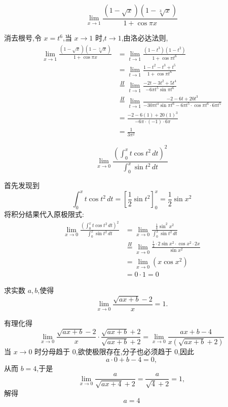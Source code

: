\begin{questions}
    \question 
    \[
    \lim_{x \to 1} \frac{(1 - \sqrt{x})(1 - \sqrt[3]{x})}{1 + \cos \pi x}
    \]
    \begin{solution}
        消去根号,令 $x = t^6$,当 $x \to 1$ 时,$t \to 1$,由洛必达法则,
        \begin{align*}
        \lim_{x \to 1} \frac{(1 - \sqrt{x})(1 - \sqrt[3]{x})}{1 + \cos \pi x} 
        &= \lim_{t \to 1} \frac{(1 - t^3)(1 - t^2)}{1 + \cos \pi t^6} \\
        &= \lim_{t \to 1} \frac{1 - t^2 - t^3 + t^5}{1 + \cos \pi t^6} \\
        &\overset{H}{=} \lim_{t \to 1} \frac{-2t - 3t^2 + 5t^4}{-6\pi t^5 \sin \pi t^6} \\
        &\overset{H}{=} \lim_{t \to 1} \frac{-2 - 6t + 20t^3}{-30\pi t^4 \sin \pi t^6 - 6\pi t^5 \cdot \cos \pi t^6 \cdot 6\pi t^5} \\
        &= \frac{-2 - 6(1) + 20(1)^3}{-6\pi \cdot (-1) \cdot 6\pi} \\
        &= \frac{1}{3\pi^2}
        \end{align*}
    \end{solution}

    \question 
    \[
    \lim_{x \to 0} \frac{\left(\int_0^x t \cos t^2 \, dt \right)^2}{\int_0^x \sin t^2 \, dt}
    \]
    \begin{solution}
        首先发现到
        \[
        \int_0^x t \cos t^2 \, dt = \left[ \frac{1}{2} \sin t^2 \right]_0^x = \frac{1}{2} \sin x^2
        \]
        将积分结果代入原极限式:
        \begin{align*}
        \lim_{x \to 0} \frac{\left(\int_0^x t \cos t^2 \, dt \right)^2}{\int_0^x \sin t^2 \, dt} 
        &= \lim_{x \to 0} \frac{\frac{1}{4} \sin^2 x^2}{\int_0^x \sin t^2 \, dt} \\
        &\overset{H}{=} \lim_{x \to 0} \frac{\frac{1}{4} \cdot 2 \sin x^2 \cdot \cos x^2 \cdot 2x}{\sin x^2} \\
        &= \lim_{x \to 0} (x \cos x^2) \\
        &= 0 \cdot 1 = 0
        \end{align*}
    \end{solution}

    \question 求实数 $a,b$,使得
    \[
    \lim_{x\to 0}\frac{\sqrt{ax+b}-2}{x}=1.
    \]
    \begin{solution}
        有理化得
        \[
        \lim_{x\to 0}\frac{\sqrt{ax+b}-2}{x}\cdot
        \frac{\sqrt{ax+b}+2}{\sqrt{ax+b}+2}
        =\lim_{x\to 0}\frac{ax+b-4}{x(\sqrt{ax+b}+2)}
        \]
        当 $x\to 0$ 时分母趋于 $0$,欲使极限存在,分子也必须趋于 $0$,因此
        \[
        a\cdot 0+b-4=0,
        \]
        从而 $b=4$,于是
        \[
        \lim_{x\to 0}\frac{a}{\sqrt{ax+4}+2}=\frac{a}{\sqrt{4}+2}=1,
        \]
        解得
        \[
        a=4
        \]
    \end{solution}


\end{questions}
